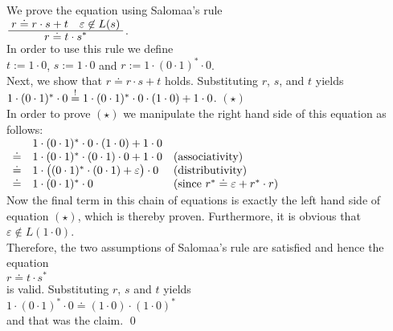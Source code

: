 \solutionEng 
We prove the equation using  Salomaa's rule
\\[0.2cm]
\hspace*{1.3cm} $\frac{\displaystyle\;r \doteq r \cdot s + t \quad \varepsilon \not\in L(s)\;}{\displaystyle r \doteq t \cdot s^*}$.
\\[0.2cm]
In order to use this rule we define 
\\[0.2cm]
\hspace*{1.3cm} $t := 1 \cdot 0$, \quad $s := 1 \cdot 0$ \quad and \quad 
$r := 1 \cdot (0 \cdot 1)^* \cdot 0$.
\\[0.2cm]
Next, we show that  $r \doteq r \cdot s + t$ holds.  Substituting $r$, $s$, and $t$ yields
\\[0.2cm]
\hspace*{1.3cm}
$1 \cdot (0 \cdot 1)^* \cdot 0 \stackrel{!}{=} 1 \cdot (0 \cdot 1)^* \cdot 0  \cdot (1 \cdot 0) + 1 \cdot 0$. 
\hspace*{\fill} $(\star)$
\\[0.2cm]
In order to prove $(\star)$ we manipulate the right hand side of this equation as follows:
\\[0.2cm]
\hspace*{1.3cm}
$
\begin{array}[t]{cll}
       & 1 \cdot (0 \cdot 1)^* \cdot 0  \cdot (1 \cdot 0) + 1 \cdot 0                 \\
\doteq & 1 \cdot (0 \cdot 1)^* \cdot (0  \cdot 1) \cdot 0 + 1 \cdot 0               & 
         \mbox{(associativity)} \\
\doteq & 1 \cdot \bigl( (0 \cdot 1)^* \cdot (0  \cdot 1) + \varepsilon\bigr)\cdot 0 & 
         \mbox{(distributivity)} \\
\doteq & 1 \cdot (0 \cdot 1)^* \cdot 0 & 
         \mbox{(since $r^* \doteq \varepsilon + r^* \cdot r$)} \\
\end{array}
$
\\[0.2cm]
Now the final term in this chain of equations is exactly the left hand side of  equation  $(\star)$,
which is thereby proven.  Furthermore, it is obvious that
\\[0.2cm]
\hspace*{1.3cm}
 $\varepsilon \not\in L(1 \cdot 0)$.  
\\[0.2cm]
Therefore, the two assumptions of Salomaa's rule are satisfied and hence the equation
\\[0.2cm]
\hspace*{1.3cm}
$r \doteq t \cdot s^*$
\\[0.2cm]
is valid.  Substituting  $r$, $s$ and $t$ yields
\\[0.2cm]
\hspace*{1.3cm}
$1 \cdot (0 \cdot 1)^* \cdot 0 \doteq (1 \cdot 0) \cdot (1 \cdot 0)^*$
\\[0.2cm]
and that was the claim.  \qed

